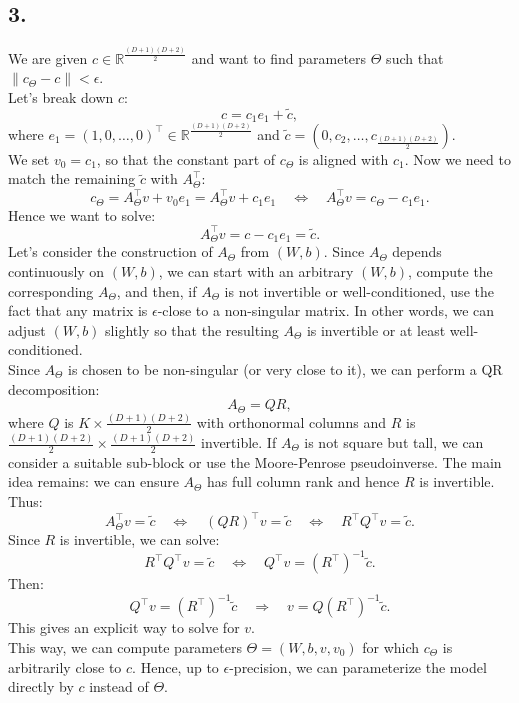 \documentclass[12pt,a4paper]{article}
\begin{document}
    \subsection{3.}
        We are given \(c \in \mathbb{R}^{\frac{(D+1)(D+2)}{2}}\) and want to find parameters \(\Theta\) such that \(\|c_{\Theta}-c\|<\epsilon\).\\
        Let's break down \(c\):
        \[c = c_1 e_1 + \tilde{c},\]
        where \(e_1 = (1,0,\ldots,0)^\top \in \mathbb{R}^{\frac{(D+1)(D+2)}{2}}\) and \(\tilde{c} = (0, c_2, \ldots, c_{\frac{(D+1)(D+2)}{2}})\). \\
        We set \(v_0 = c_1\), so that the constant part of \(c_{\Theta}\) is aligned with \(c_1\). Now we need to match the remaining \(\tilde{c}\) with \(A_{\Theta}^\top\):
        \[c_{\Theta} = A_{\Theta}^\top v + v_0 e_1 = A_{\Theta}^\top v + c_1 e_1
        \quad \Leftrightarrow \quad A_{\Theta}^\top v = c_{\Theta} - c_1 e_1.\]
        Hence we want to solve:
        \[A_{\Theta}^\top v = c - c_1 e_1 = \tilde{c}.\]
        Let's consider the construction of \(A_\Theta\) from \((W,b)\). Since \(A_\Theta\) depends continuously on \((W,b)\), we can start with an arbitrary \((W,b)\), compute the corresponding \(A_\Theta\), and then, if \(A_\Theta\) is not invertible or well-conditioned, use the fact that any matrix is \(\epsilon\)-close to a non-singular matrix. In other words, we can adjust \((W,b)\) slightly so that the resulting \(A_\Theta\) is invertible or at least well-conditioned. \\
        Since \(A_\Theta\) is chosen to be non-singular (or very close to it), we can perform a QR decomposition:
        \[A_\Theta = Q R,\]
        where \(Q\) is \(K\times \frac{(D+1)(D+2)}{2}\) with orthonormal columns and \(R\) is \(\frac{(D+1)(D+2)}{2} \times \frac{(D+1)(D+2)}{2}\) invertible.
        If \(A_\Theta\) is not square but tall, we can consider a suitable sub-block or use the Moore-Penrose pseudoinverse. The main idea remains: we can ensure \(A_\Theta\) has full column rank and hence \(R\) is invertible. \\
        Thus:
        \[A_\Theta^\top v = \tilde{c} \quad \Leftrightarrow \quad (Q R)^\top v = \tilde{c} \quad \Leftrightarrow \quad R^\top Q^\top v = \tilde{c}.\]
        Since \(R\) is invertible, we can solve:
        \[R^\top Q^\top v = \tilde{c} \quad \Leftrightarrow \quad Q^\top v = (R^\top)^{-1} \tilde{c}.\]
        Then:
        \[Q^\top v = (R^\top)^{-1} \tilde{c} \quad \Rightarrow \quad v = Q (R^\top)^{-1} \tilde{c}.\]
        This gives an explicit way to solve for \(v\). \\
        This way, we can compute parameters \(\Theta = (W,b,v,v_0)\) for which \(c_\Theta\) is arbitrarily close to \(c\). Hence, up to \(\epsilon\)-precision, we can parameterize the model directly by \(c\) instead of \(\Theta\).
\end{document}
